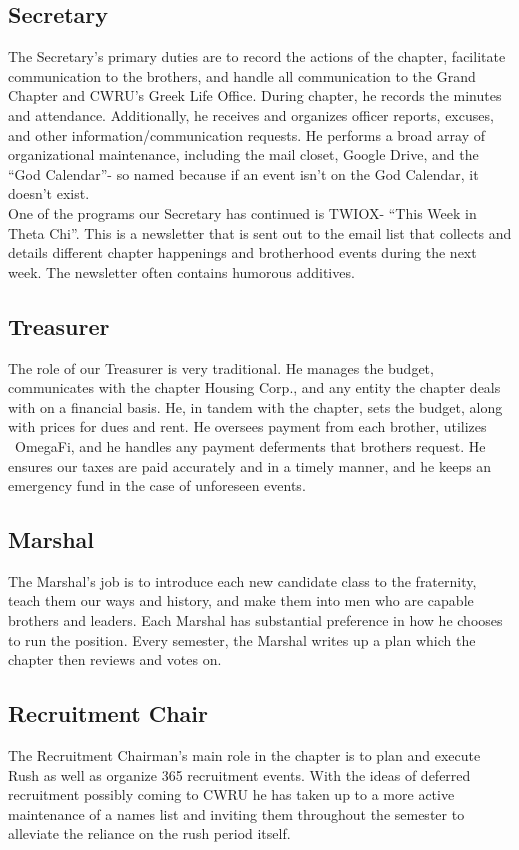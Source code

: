       \subsection*{Secretary}
	The Secretary's primary duties are to record the actions of the chapter, facilitate communication to the brothers, and handle all communication to the Grand Chapter and CWRU's Greek Life Office. During chapter, he records the minutes and attendance. Additionally, he receives and organizes officer reports, excuses, and other information/communication requests. He performs a broad array of organizational maintenance, including the mail closet, Google Drive, and the ``God Calendar''- so named because if an event isn't on the God Calendar, it doesn't exist. \\

	One of the programs our Secretary has continued is TWIOX- ``This Week in Theta Chi''. This is a newsletter that is sent out to the email list that collects and details different chapter happenings and brotherhood events during the next week. The newsletter often contains humorous additives.
	
      \subsection*{Treasurer}
	The role of our Treasurer is very traditional. He manages the budget, communicates with the chapter Housing Corp., and any entity the chapter deals with on a financial basis. He, in tandem with the chapter, sets the budget, along with prices for dues and rent. He oversees payment from each brother, utilizes  OmegaFi, and he handles any payment deferments that brothers request. He ensures our taxes are paid accurately and in a timely manner, and he keeps an emergency fund in the case of unforeseen events. 
      
      \subsection*{Marshal}
	The Marshal's job is to introduce each new candidate class to the fraternity, teach them our ways and history, and make them into men who are capable brothers and leaders. Each Marshal has substantial preference in how he chooses to run the position. Every semester, the Marshal writes up a plan which the chapter then reviews and votes on. 

      \subsection*{Recruitment Chair}
	The Recruitment Chairman's main role in the chapter is to plan and execute Rush as well as organize 365 recruitment events. With the ideas of deferred recruitment possibly coming to CWRU he has taken up to a more active maintenance of a names list and inviting them throughout the semester to alleviate the reliance on the rush period itself.
	
